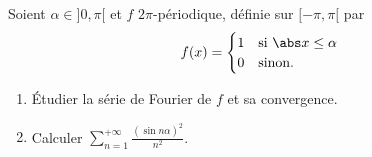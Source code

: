 \begin{enonce}
\begin{exercise}[ID={RMS 122-2 E1337 Mines Alès PC},subtitle={},tags={}]
  Soient $\alpha\in]0,\pi[$ et $f$ $2\pi$-périodique, définie sur $[-\pi,\pi[$ par
  \begin{equation*}
    f(x)=
    \begin{cases}
      1&\text{si } \abs x\leq \alpha\\
      0&\text{sinon.}
    \end{cases}
  \end{equation*}
  \begin{enumerate}
    \item Étudier la série de Fourier de $f$ et sa convergence.
    \item Calculer $\displaystyle\sum_{n=1}^{+\infty} \frac{(\sin n\alpha)^2}{n^2}$.
  \end{enumerate}
\end{exercise}
\begin{solution}
\end{solution}
\end{enonce}
